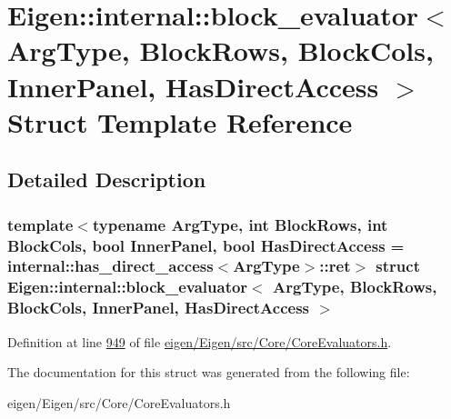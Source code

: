 \hypertarget{struct_eigen_1_1internal_1_1block__evaluator}{}\section{Eigen\+:\+:internal\+:\+:block\+\_\+evaluator$<$ Arg\+Type, Block\+Rows, Block\+Cols, Inner\+Panel, Has\+Direct\+Access $>$ Struct Template Reference}
\label{struct_eigen_1_1internal_1_1block__evaluator}


\subsection{Detailed Description}
\subsubsection*{template$<$typename Arg\+Type, int Block\+Rows, int Block\+Cols, bool Inner\+Panel, bool Has\+Direct\+Access = internal\+::has\+\_\+direct\+\_\+access$<$\+Arg\+Type$>$\+::ret$>$\newline
struct Eigen\+::internal\+::block\+\_\+evaluator$<$ Arg\+Type, Block\+Rows, Block\+Cols, Inner\+Panel, Has\+Direct\+Access $>$}



Definition at line \hyperlink{eigen_2_eigen_2src_2_core_2_core_evaluators_8h_source_l00949}{949} of file \hyperlink{eigen_2_eigen_2src_2_core_2_core_evaluators_8h_source}{eigen/\+Eigen/src/\+Core/\+Core\+Evaluators.\+h}.



The documentation for this struct was generated from the following file\+:\begin{DoxyCompactItemize}
\item 
eigen/\+Eigen/src/\+Core/\+Core\+Evaluators.\+h\end{DoxyCompactItemize}

